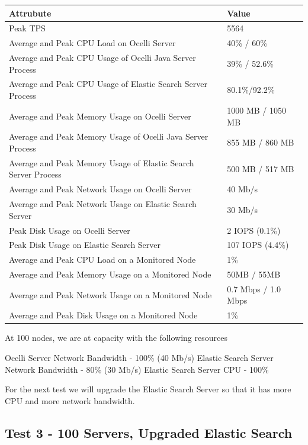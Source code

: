 \documentclass{llncs}
\begin{document}
\begin{flushleft}
    \begin{tabular}{ | l | l |}
    \hline
  Attrubute & Value  \\ \hline
  Peak TPS & 5564  \\ \hline
  Average and Peak CPU Load on Ocelli Server &40\% / 60\%  \\ \hline
  Average and Peak CPU Usage of Ocelli Java Server Process & 39\% / 52.6\% \\ \hline
 Average and Peak CPU Usage of Elastic Search Server Process & 80.1\%/92.2\%	  \\ \hline
  Average and Peak Memory Usage on Ocelli Server & 1000 MB / 1050 MB	 \\ \hline
  Average and Peak Memory Usage of Ocelli Java Server Process &	855 MB / 860 MB		 \\ \hline
 Average and Peak Memory Usage of Elastic Search Server Process &	500 MB / 517 MB		 \\ \hline
Average and Peak Network Usage on Ocelli Server &	40 Mb/s 	 \\ \hline
Average and Peak Network Usage on Elastic Search Server & 30 Mb/s 	 \\ \hline
Peak Disk Usage on Ocelli Server &	2 IOPS (0.1\%)		 \\ \hline
Peak Disk Usage on Elastic Search Server &	107 IOPS (4.4\%)		 \\ \hline
Average and Peak CPU Load on a Monitored Node& 	1\% 	 \\ \hline
  Average and Peak Memory Usage on a Monitored Node &	50MB / 55MB	 \\ \hline
Average and Peak Network Usage on a Monitored Node &	0.7 Mbps / 1.0 Mbps		 \\ \hline
  Average and Peak Disk Usage on a Monitored Node &  1\%	\\ 
    \hline
    \end{tabular}
\end{flushleft}

At 100 nodes, we are at capacity with the following resources

Ocelli Server Network Bandwidth - 100\% (40 Mb/s)
Elastic Search Server Network Bandwidth - 80\% (30 Mb/s)
Elastic Search Server CPU - 100\%

For the next test we will upgrade the Elastic Search Server so that it has more CPU and more network bandwidth.

\subsection{Test 3 - 100 Servers, Upgraded Elastic Search}
\end{document}
